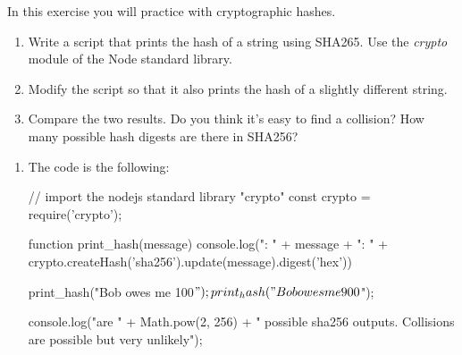 
\begin{Exercise}[label={basic-js-crypto-sha256}]
In this exercise you will practice with cryptographic hashes.

\begin{enumerate}[1.]
\item Write a script that prints the hash of a string using SHA265. 
Use the \textit{crypto} module of the Node standard library.
\item Modify the script so that it also prints 
the hash of a slightly different string. 
\item Compare the two results. 
Do you think it's easy to find a collision? 
How many possible hash digests are there in SHA256?
	
\end{enumerate}
\end{Exercise}

\begin{Answer}[ref={basic-js-crypto-sha256}]
\begin{enumerate}[1.]
\item The code is the following: 

\begin{js}
// import the nodejs standard library "crypto"
const crypto = require('crypto');


function print_hash(message) {
    console.log("\nMessage: " + message +
        "\nHASH: " + 
        crypto.createHash('sha256').update(message).digest('hex'))
}

print_hash("Bob owes me 100$");
print_hash("Bob owes me 900$");

console.log("\nThere are " + Math.pow(2, 256) 
+ " possible sha256 outputs. Collisions are possible but very unlikely");
\end{js}
\end{enumerate}
\end{Answer}



